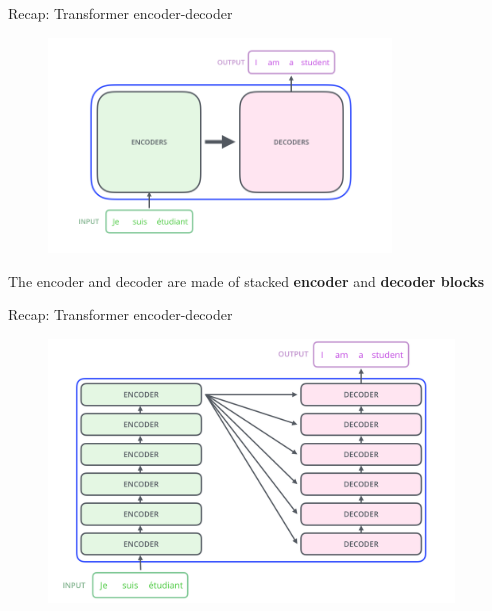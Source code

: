 \documentclass[12pt,aspectratio=169,handout]{beamer}
\begin{document}
\begin{frame}{Recap: Transformer encoder-decoder}
	\begin{center}
		\begin{figure}[h]
			\includegraphics[height=5.7cm]{transformer_encoders_decoders}
		\end{figure}
	\end{center}
	\pause
	The encoder and decoder are made of stacked \textbf{encoder} and \textbf{decoder blocks} 
\end{frame}

\begin{frame}{Recap: Transformer encoder-decoder}
	\begin{center}
		\begin{figure}[h]
			\includegraphics[height=7cm]{transformer_encoder_decoder_stack}
		\end{figure}
	\end{center}
\end{frame}
\end{document}

